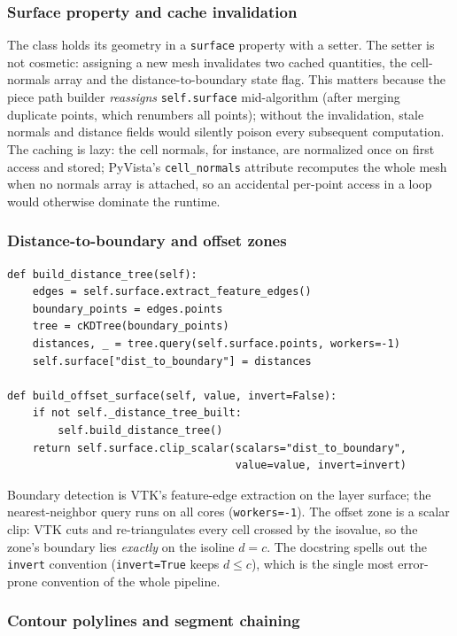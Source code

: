 \subsubsection{Surface property and cache invalidation}

The class holds its geometry in a \texttt{surface} property with a
setter. The setter is not cosmetic: assigning a new mesh invalidates
two cached quantities, the cell-normals array and the
distance-to-boundary state flag. This matters because the piece path
builder \emph{reassigns} \texttt{self.surface} mid-algorithm (after
merging duplicate points, which renumbers all points); without the
invalidation, stale normals and distance fields would silently poison
every subsequent computation. The caching is lazy: the cell normals,
for instance, are normalized once on first access and stored; PyVista's
\texttt{cell\_normals} attribute recomputes the whole mesh when no
normals array is attached, so an accidental per-point access in a loop
would otherwise dominate the runtime.

\subsubsection{Distance-to-boundary and offset zones}

\begin{lstlisting}[caption={Distance field and offset zone (essence).}]
def build_distance_tree(self):
    edges = self.surface.extract_feature_edges()
    boundary_points = edges.points
    tree = cKDTree(boundary_points)
    distances, _ = tree.query(self.surface.points, workers=-1)
    self.surface["dist_to_boundary"] = distances

def build_offset_surface(self, value, invert=False):
    if not self._distance_tree_built:
        self.build_distance_tree()
    return self.surface.clip_scalar(scalars="dist_to_boundary",
                                    value=value, invert=invert)
\end{lstlisting}
Boundary detection is VTK's feature-edge extraction on the layer
surface; the nearest-neighbor query runs on all cores
(\texttt{workers=-1}). The offset zone is a scalar clip: VTK cuts and
re-triangulates every cell crossed by the isovalue, so the zone's
boundary lies \emph{exactly} on the isoline $d = c$. The docstring
spells out the \texttt{invert} convention (\texttt{invert=True} keeps
$d \le c$), which is the single most error-prone convention of the
whole pipeline.

\subsubsection{Contour polylines and segment chaining}

